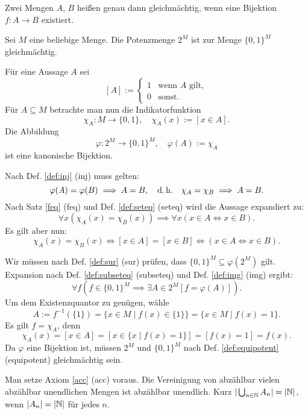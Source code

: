 \begin{Definition}%
\label{def:equipotent}
Zwei Mengen $A$, $B$ heißen genau dann gleichmächtig, wenn
eine Bijektion $f\colon A\to B$ existiert.
\end{Definition}

\begin{Satz}
Sei $M$ eine beliebige Menge. Die Potenzmenge $2^M$ ist zur
Menge $\{0,1\}^M$ gleichmächtig.
\end{Satz}

\begin{Beweis}
Für eine Aussage $A$ sei
\[[A] := \begin{cases}
1&\text{wenn $A$ gilt},\\
0&\text{sonst}.
\end{cases}\]
Für $A\subseteq M$ betrachte man nun die
Indikatorfunktion
\[\chi_A\colon M\to\{0,1\},\quad \chi_A(x):=[x\in A].\]
Die Abbildung
\[\varphi\colon 2^M\to \{0,1\}^M,\quad \varphi(A):=\chi_A\]
ist eine kanonische Bijektion.

Nach Def. \ref{def:inj} (inj) muss gelten:
\[\varphi(A)=\varphi(B)\implies A=B,\quad\text{d.\,h.}\quad
\chi_A=\chi_B \implies A=B.\]
Nach Satz \ref{feq} (feq) und Def. \ref{def:seteq} (seteq)
wird die Aussage expandiert zu:
\[\forall x(\chi_A(x)=\chi_B(x))\implies \forall x(x\in A\iff x\in B).\]
Es gilt aber nun:
\[\chi_A(x)=\chi_B(x)\iff [x\in A]=[x\in B] \iff (x\in A\iff x\in B).\]
\end{Beweis}
 Wir müssen nach Def. \ref{def:sur} (sur)
prüfen, dass $\{0,1\}^M\subseteq \varphi(2^M)$ gilt.
Expansion nach Def. \ref{def:subseteq} (subseteq) und
Def. \ref{def:img} (img)
ergibt:
\[\forall f(f\in \{0,1\}^M\implies\exists A{\in}2^M[f=\varphi(A)]).\]
Um dem Existenzquantor zu genügen, wähle
\[A := f^{-1}(\{1\}) = \{x\in M\mid f(x)\in \{1\}\} = \{x\in M\mid f(x)=1\}.\]
Es gilt $f=\chi_A$, denn
\[\chi_A(x) = [x\in A] = [x\in\{x\mid f(x)=1\}] = [f(x)=1] = f(x).\]
Da $\varphi$ eine Bijektion ist, müssen $2^M$ und $\{0,1\}^M$
nach Def. \ref{def:equipotent} (equipotent) gleichmächtig
sein.\,\qedsymbol

\newpage
\begin{Satz}\label{countable-union-countable}
Man setze Axiom \ref{acc} (acc) voraus.
Die Vereinigung von abzählbar vielen abzählbar unendlichen Mengen
ist abzählbar unendlich. Kurz $|\bigcup_{n\in\mathbb N} A_n| = |\mathbb N|$, wenn
$|A_n|=|\mathbb N|$ für jedes $n$.
\end{Satz}

